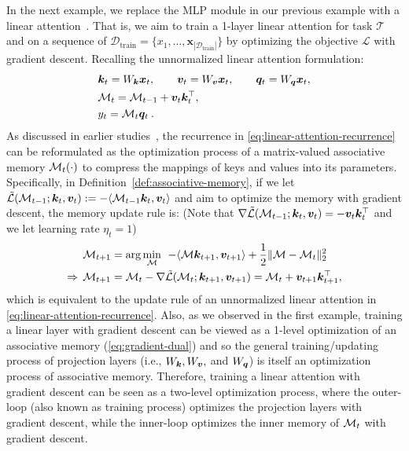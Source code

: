 In the next example, we replace the MLP module in our previous example with a linear attention~\citep{katharopoulos2020transformers}. That is, we aim to train a 1-layer linear attention for task $\mathcal{T}$ and on a sequence of $\mathcal{D}_{\text{train}} = \{x_1, \dots, \boldsymbol{x}_{|\mathcal{D}_{\text{train}}|}\}$ by optimizing the objective $\mathcal{L}$ with gradient descent. Recalling the unnormalized linear attention formulation: 
\begin{align}\label{eq:linear-attn-projection}
    & \boldsymbol{k}_t =  W_{\boldsymbol{k}} \boldsymbol{x}_t , \qquad \boldsymbol{v}_t =  W_{\boldsymbol{v}} \boldsymbol{x}_t, \qquad \boldsymbol{q}_t =  W_{\boldsymbol{q}}\boldsymbol{x}_t,   \\ \label{eq:linear-attention-recurrence}
    &\mathcal{M}_{t} = \mathcal{M}_{t-1} + \boldsymbol{v}_t \boldsymbol{k}_t^{\top}, \\ \label{eq:linear-attn-output}
    &y_t = \mathcal{M}_t \boldsymbol{q}_t \:.
\end{align}
As discussed in earlier studies~\citep{liu2024longhorn, behrouz2025Miras}, the recurrence in \autoref{eq:linear-attention-recurrence} can be reformulated as the optimization process of a matrix-valued associative memory $\mathcal{M}_t(\cdot)$ to compress the mappings of keys and values into its parameters. Specifically, in Definition~\ref{def:associative-memory}, if we let $\tilde{\mathcal{L}}(\mathcal{M}_{t-1}; \boldsymbol{k}_t, \boldsymbol{v}_t) := - \langle \mathcal{M}_{t-1} \boldsymbol{k}_t, \boldsymbol{v}_t \rangle$ and aim to optimize the memory with gradient descent, the memory update rule is: (Note that $\nabla \tilde{\mathcal{L}}(\mathcal{M}_{t-1}; \boldsymbol{k}_t, \boldsymbol{v}_t) = - \boldsymbol{v}_t \boldsymbol{k}_t^{\top}$ and we let learning rate $\eta_{t} = 1$)    
\begin{align}\label{eq:linear-attention-optimization}
    &\mathcal{M}_{t+1} = \arg \min_{\mathcal{M}} \:\: - \langle \mathcal{M} \boldsymbol{k}_{t+1}, \boldsymbol{v}_{t+1} \rangle + \frac{1}{2}\| \mathcal{M} - \mathcal{M}_{t} \|^2_2 \quad  \\ 
    \Rightarrow \:\: &\mathcal{M}_{t+1} = \mathcal{M}_t - \nabla \tilde{\mathcal{L}}(\mathcal{M}_t; \boldsymbol{k}_{t+1}, \boldsymbol{v}_{t+1}) = \mathcal{M}_t + \boldsymbol{v}_{t+1} \boldsymbol{k}_{t+1}^{\top},
\end{align}
which is equivalent to the update rule of an unnormalized linear attention in \autoref{eq:linear-attention-recurrence}. Also, as we observed in the first example, training a linear layer with gradient descent can be viewed as a 1-level optimization of an associative memory (\autoref{eq:gradient-dual}) and so the general training/updating process of projection layers  (i.e., $W_{\boldsymbol{k}}, W_{\boldsymbol{v}},$ and $W_{\boldsymbol{q}}$) is itself an optimization process of associative memory. Therefore, training a linear attention with gradient descent can be seen as a two-level optimization process, where the outer-loop (also known as training process) optimizes the projection layers with gradient descent, while the inner-loop optimizes the inner memory of $\mathcal{M}_t$ with gradient descent. 


